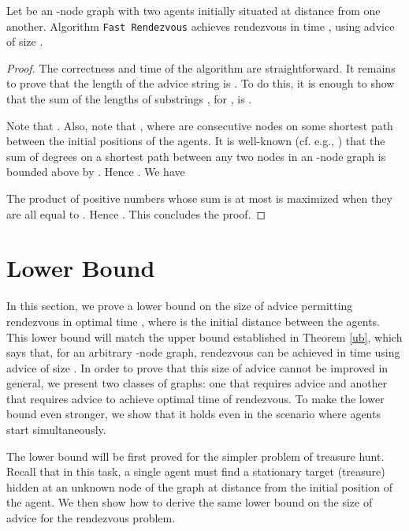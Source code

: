 \documentclass{llncs}
\begin{document}
\begin{theorem}\label{ub}
Let  be an -node graph with two agents initially situated at distance  from one another.
Algorithm {\tt Fast Rendezvous} achieves rendezvous in time , using advice of size
 .
\end{theorem}

\begin{proof}
The correctness and time of the algorithm are straightforward. It remains to prove that the
 length of the advice string  is . To do this, it is enough to show that the sum of the lengths  of substrings , for ,
 is . 
 
 Note that . 
 Also, note that
 , where  are consecutive nodes on some shortest path between the initial positions of the agents.
 It is well-known (cf. e.g.,  \cite{FP1}) that the sum of degrees on a shortest path between any two nodes in an -node graph is bounded above
 by . Hence . We have 
 
 The product of  positive numbers whose sum is at most  is maximized when they are all equal to .
 Hence . This concludes the proof.
\end{proof}









\section{Lower Bound}

In this section, we prove a lower bound on the size of advice permitting rendezvous in optimal time , where  is the initial distance between the agents. This lower bound will match the upper bound established in
Theorem \ref{ub}, which says that, for an arbitrary -node graph, rendezvous can be achieved in time  using advice of size
 . In order to prove that this size of advice cannot be improved in general, we present two classes of graphs: one that requires
 advice  and another that requires advice  to achieve optimal time of rendezvous. To make the lower bound even stronger, we show that it holds even in the scenario where agents start simultaneously. 
 
 The   lower bound will be first proved for the simpler problem of treasure hunt. Recall that in this task,
 a single agent must find a stationary target (treasure) hidden at an unknown node of the graph at distance  from the initial position of the agent. 
We then show how to derive the same lower bound on the size of advice for the rendezvous problem.
 
\end{document}
